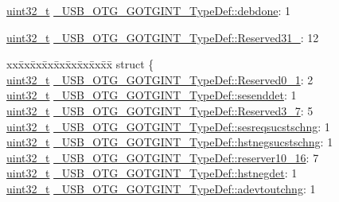\begin{DoxyCompactItemize}
\item 
\hyperlink{stdint_8h_a435d1572bf3f880d55459d9805097f62}{uint32\-\_\-t} \hyperlink{group___u_s_b___o_t_g___d_r_i_v_e_r_gab634dbc7a75e92711261edb16b3c3d7d}{\-\_\-\-U\-S\-B\-\_\-\-O\-T\-G\-\_\-\-G\-O\-T\-G\-I\-N\-T\-\_\-\-Type\-Def\-::debdone}\-: 1
\item 
\hyperlink{stdint_8h_a435d1572bf3f880d55459d9805097f62}{uint32\-\_\-t} \hyperlink{group___u_s_b___o_t_g___d_r_i_v_e_r_gab48b8fbd939a2b311335643ef6020ab7}{\-\_\-\-U\-S\-B\-\_\-\-O\-T\-G\-\_\-\-G\-O\-T\-G\-I\-N\-T\-\_\-\-Type\-Def\-::\-Reserved31\-\_}\-: 12
\item 
\begin{tabbing}
xx\=xx\=xx\=xx\=xx\=xx\=xx\=xx\=xx\=\kill
struct \{\\
\>\hyperlink{stdint_8h_a435d1572bf3f880d55459d9805097f62}{uint32\_t} \hyperlink{group___u_s_b___o_t_g___d_r_i_v_e_r_gaa27cf9c3b6dabb69c2e2c1bf48655e7d}{\_USB\_OTG\_GOTGINT\_TypeDef::Reserved0\_1}: 2\\
\>\hyperlink{stdint_8h_a435d1572bf3f880d55459d9805097f62}{uint32\_t} \hyperlink{group___u_s_b___o_t_g___d_r_i_v_e_r_gac879190d50dfae7a98b21236d524b7da}{\_USB\_OTG\_GOTGINT\_TypeDef::sesenddet}: 1\\
\>\hyperlink{stdint_8h_a435d1572bf3f880d55459d9805097f62}{uint32\_t} \hyperlink{group___u_s_b___o_t_g___d_r_i_v_e_r_gad5f21fa6443d761dd45cf6056dbbadc3}{\_USB\_OTG\_GOTGINT\_TypeDef::Reserved3\_7}: 5\\
\>\hyperlink{stdint_8h_a435d1572bf3f880d55459d9805097f62}{uint32\_t} \hyperlink{group___u_s_b___o_t_g___d_r_i_v_e_r_gae1b7683211f53c2ae86a79983383a49f}{\_USB\_OTG\_GOTGINT\_TypeDef::sesreqsucstschng}: 1\\
\>\hyperlink{stdint_8h_a435d1572bf3f880d55459d9805097f62}{uint32\_t} \hyperlink{group___u_s_b___o_t_g___d_r_i_v_e_r_ga4910cdca8d45c257197d1eafda55ddbb}{\_USB\_OTG\_GOTGINT\_TypeDef::hstnegsucstschng}: 1\\
\>\hyperlink{stdint_8h_a435d1572bf3f880d55459d9805097f62}{uint32\_t} \hyperlink{group___u_s_b___o_t_g___d_r_i_v_e_r_gae428c081adf043cb149c9d1dd45c1a99}{\_USB\_OTG\_GOTGINT\_TypeDef::reserver10\_16}: 7\\
\>\hyperlink{stdint_8h_a435d1572bf3f880d55459d9805097f62}{uint32\_t} \hyperlink{group___u_s_b___o_t_g___d_r_i_v_e_r_ga31938c28140ff521cead9f6178569b80}{\_USB\_OTG\_GOTGINT\_TypeDef::hstnegdet}: 1\\
\>\hyperlink{stdint_8h_a435d1572bf3f880d55459d9805097f62}{uint32\_t} \hyperlink{group___u_s_b___o_t_g___d_r_i_v_e_r_ga39bad2c1d3b0fda34c485f0f40e06619}{\_USB\_OTG\_GOTGINT\_TypeDef::adevtoutchng}: 1\\

\end{tabbing}
\end{DoxyCompactItemize}
